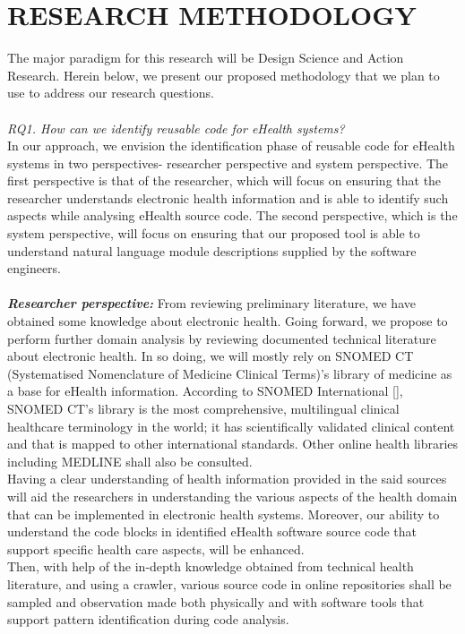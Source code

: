 \documentclass[a4paper]{article}
\begin{document}
\section{RESEARCH METHODOLOGY}
\vspace{-10pt}
The major paradigm for this research will be Design Science and Action Research. Herein below, we present our proposed methodology that we plan to use to address our research questions.\\ \\
\textit{RQ1. How can we identify reusable code for eHealth systems?} \\
In our approach, we envision the identification phase of reusable code for eHealth systems in two perspectives- researcher perspective and system perspective. The first perspective is that of the researcher, which will focus on ensuring that the researcher understands electronic health information and is able to identify such aspects while analysing eHealth source code. The second perspective, which is the system perspective, will focus on ensuring that our proposed tool is able to understand natural language module descriptions supplied by the software engineers.  \\ \\
\textit{\textbf{Researcher perspective:}} From reviewing preliminary literature, we have obtained some knowledge about electronic health. Going forward, we propose to perform further domain analysis by reviewing documented technical literature about electronic health. In so doing, we will mostly rely on SNOMED CT (Systematised Nomenclature of Medicine Clinical Terms)'s library of medicine as a base for eHealth information. According to SNOMED  International [], SNOMED CT's library is the most comprehensive, multilingual clinical healthcare terminology in the world; it has scientifically validated clinical content and that is mapped to other international standards. Other online health libraries including MEDLINE shall also be consulted. \\
Having a clear understanding of health information provided in the said sources will aid the researchers in understanding the various aspects of the health domain that can be implemented in electronic health systems. Moreover, our ability to understand the code blocks  in identified eHealth software source code that support specific health care aspects, will be enhanced. \\
Then, with help of the in-depth knowledge obtained from technical health literature, and using a crawler, various source code in online repositories shall be sampled and observation made both physically and with software tools that support pattern identification during code analysis.
\end{document}
